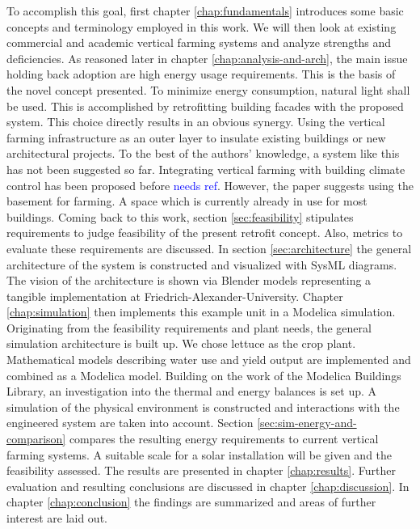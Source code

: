 To accomplish this goal, first chapter \ref{chap:fundamentals} introduces some basic concepts and terminology employed in this work.
We will then look at existing commercial and academic vertical farming systems and analyze strengths and deficiencies.
As reasoned later in chapter \ref{chap:analysis-and-arch}, the main issue holding back adoption are high energy usage requirements.
This is the basis of the novel concept presented.
To minimize energy consumption, natural light shall be used.
This is accomplished by retrofitting building facades with the proposed system.
This choice directly results in an obvious synergy.
Using the vertical farming infrastructure as an outer layer to insulate existing buildings or new architectural projects.
To the best of the authors' knowledge, a system like this has not been suggested so far.
Integrating vertical farming with building climate control has been proposed before \textcolor{Blue}{needs ref}.
However, the paper suggests using the basement for farming.
A space which is currently already in use for most buildings.
Coming back to this work, section \ref{sec:feasibility} stipulates requirements to judge feasibility of the present retrofit concept.
Also, metrics to evaluate these requirements are discussed.
In section \ref{sec:architecture} the general architecture of the system is constructed and visualized with SysML diagrams.
The vision of the architecture is shown via Blender models representing a tangible implementation at Friedrich-Alexander-University.
Chapter \ref{chap:simulation} then implements this example unit in a Modelica simulation.
Originating from the feasibility requirements and plant needs, the general simulation architecture is built up.
We chose lettuce as the crop plant.
Mathematical models describing water use and yield output are implemented and combined as a Modelica model.
Building on the work of the Modelica Buildings Library, an investigation into the thermal and energy balances is set up.
A simulation of the physical environment is constructed and interactions with the engineered system are taken into account.
Section \ref{sec:sim-energy-and-comparison} compares the resulting energy requirements to current vertical farming systems.
A suitable scale for a solar installation will be given and the feasibility assessed.
The results are presented in chapter \ref{chap:results}.
Further evaluation and resulting conclusions are discussed in chapter \ref{chap:discussion}.
In chapter \ref{chap:conclusion} the findings are summarized and areas of further interest are laid out.


